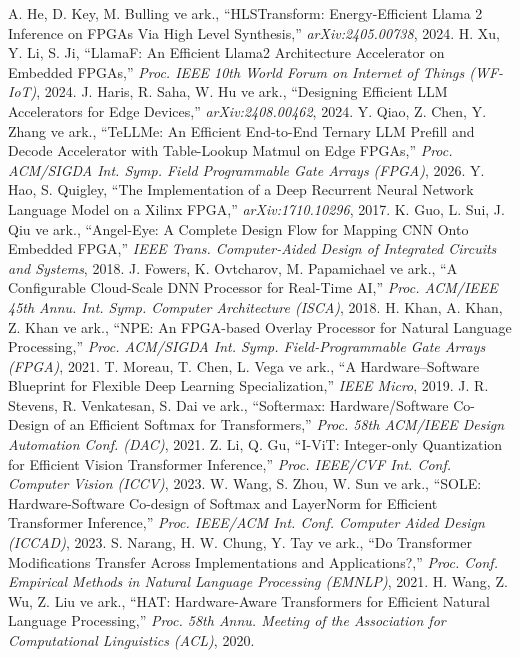  A. He, D. Key, M. Bulling ve ark., ``HLSTransform: Energy-Efficient Llama 2 Inference on FPGAs Via High Level Synthesis,'' \emph{arXiv:2405.00738}, 2024.
 H. Xu, Y. Li, S. Ji, ``LlamaF: An Efficient Llama2 Architecture Accelerator on Embedded FPGAs,'' \emph{Proc. IEEE 10th World Forum on Internet of Things (WF-IoT)}, 2024.
 J. Haris, R. Saha, W. Hu ve ark., ``Designing Efficient LLM Accelerators for Edge Devices,'' \emph{arXiv:2408.00462}, 2024.
 Y. Qiao, Z. Chen, Y. Zhang ve ark., ``TeLLMe: An Efficient End-to-End Ternary LLM Prefill and Decode Accelerator with Table-Lookup Matmul on Edge FPGAs,'' \emph{Proc. ACM/SIGDA Int. Symp. Field Programmable Gate Arrays (FPGA)}, 2026.
 Y. Hao, S. Quigley, ``The Implementation of a Deep Recurrent Neural Network Language Model on a Xilinx FPGA,'' \emph{arXiv:1710.10296}, 2017.
 K. Guo, L. Sui, J. Qiu ve ark., ``Angel-Eye: A Complete Design Flow for Mapping CNN Onto Embedded FPGA,'' \emph{IEEE Trans. Computer-Aided Design of Integrated Circuits and Systems}, 2018.
 J. Fowers, K. Ovtcharov, M. Papamichael ve ark., ``A Configurable Cloud-Scale DNN Processor for Real-Time AI,'' \emph{Proc. ACM/IEEE 45th Annu. Int. Symp. Computer Architecture (ISCA)}, 2018.
 H. Khan, A. Khan, Z. Khan ve ark., ``NPE: An FPGA-based Overlay Processor for Natural Language Processing,'' \emph{Proc. ACM/SIGDA Int. Symp. Field-Programmable Gate Arrays (FPGA)}, 2021.
 T. Moreau, T. Chen, L. Vega ve ark., ``A Hardware--Software Blueprint for Flexible Deep Learning Specialization,'' \emph{IEEE Micro}, 2019.
 J. R. Stevens, R. Venkatesan, S. Dai ve ark., ``Softermax: Hardware/Software Co-Design of an Efficient Softmax for Transformers,'' \emph{Proc. 58th ACM/IEEE Design Automation Conf. (DAC)}, 2021.
 Z. Li, Q. Gu, ``I-ViT: Integer-only Quantization for Efficient Vision Transformer Inference,'' \emph{Proc. IEEE/CVF Int. Conf. Computer Vision (ICCV)}, 2023.
 W. Wang, S. Zhou, W. Sun ve ark., ``SOLE: Hardware-Software Co-design of Softmax and LayerNorm for Efficient Transformer Inference,'' \emph{Proc. IEEE/ACM Int. Conf. Computer Aided Design (ICCAD)}, 2023.
 S. Narang, H. W. Chung, Y. Tay ve ark., ``Do Transformer Modifications Transfer Across Implementations and Applications?,'' \emph{Proc. Conf. Empirical Methods in Natural Language Processing (EMNLP)}, 2021.
 H. Wang, Z. Wu, Z. Liu ve ark., ``HAT: Hardware-Aware Transformers for Efficient Natural Language Processing,'' \emph{Proc. 58th Annu. Meeting of the Association for Computational Linguistics (ACL)}, 2020.
